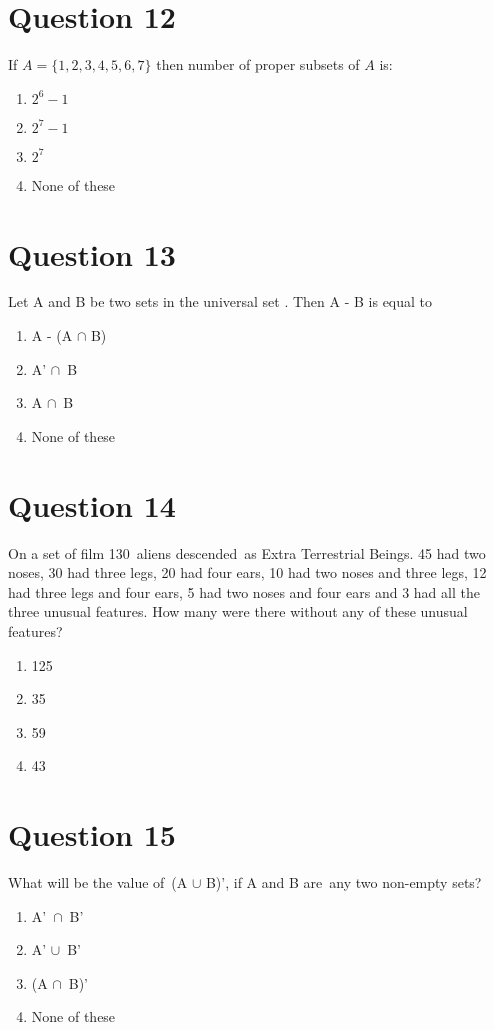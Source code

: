 \documentclass{article}
\begin{document}
\section*{Question 12}
If \(A=\{1,2,3,4,5,6,7\}\) then number of proper subsets of \(A\) is:\newline
\begin{enumerate}[label=(\alph*)]
\item \(2^6-1\)
\item \(2^7-1\)
\item \(2^7\)
\item None of these
\end{enumerate}
\newpage
\section*{Question 13}
Let A and B be two sets in the universal set . Then A - B is equal to
\begin{enumerate}[label=(\alph*)]
\item A - (A \(\cap\) B)\newline
\item A’ \(\cap\) B
\item A \(\cap\) B
\item None of these\newline
\end{enumerate}
\newpage
\section*{Question 14}
On a set of film 130 aliens descended as Extra Terrestrial Beings. 45 had two noses, 30 had three legs, 20 had four ears, 10 had two noses and three legs, 12 had three legs and four ears, 5 had two noses and four ears and 3 had all the three unusual features. How many were there without any of these unusual features?
\begin{enumerate}[label=(\alph*)]
\item 125
\item 35
\item 59
\item 43
\end{enumerate}
\newpage
\section*{Question 15}
What will be the value of (A \(\cup\) B)', if A and B are any two non-empty sets?
\begin{enumerate}[label=(\alph*)]
\item A' \(\cap\) B'\newline
\item A' \(\cup\) B'
\item (A \(\cap\) B)'
\item None of these
\end{enumerate}
\newpage
\end{document}
